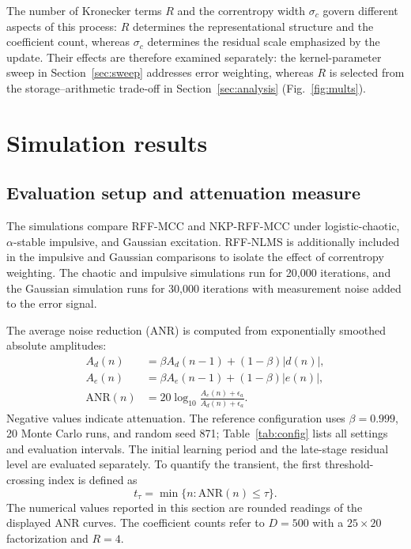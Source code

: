 \documentclass[preprint,12pt]{elsarticle}
\begin{document}
The number of Kronecker terms $R$ and the correntropy width $\sigma_c$ govern different aspects of this process: $R$ determines the representational structure and the coefficient count, whereas $\sigma_c$ determines the residual scale emphasized by the update. Their effects are therefore examined separately: the kernel-parameter sweep in Section~\ref{sec:sweep} addresses error weighting, whereas $R$ is selected from the storage--arithmetic trade-off in Section~\ref{sec:analysis} (Fig.~\ref{fig:mults}).

\section{Simulation results}\label{sec:sim}

\subsection{Evaluation setup and attenuation measure}

The simulations compare RFF-MCC and NKP-RFF-MCC under logistic-chaotic, $\alpha$-stable impulsive, and Gaussian excitation. RFF-NLMS is additionally included in the impulsive and Gaussian comparisons to isolate the effect of correntropy weighting. The chaotic and impulsive simulations run for 20,000 iterations, and the Gaussian simulation runs for 30,000 iterations with measurement noise added to the error signal.

The average noise reduction (ANR) is computed from exponentially smoothed absolute amplitudes:
\begin{equation}
\begin{aligned}
A_d(n) &= \beta A_d(n-1) + (1-\beta)|d(n)|, \\
A_e(n) &= \beta A_e(n-1) + (1-\beta)|e(n)|, \\
\mathrm{ANR}(n) &= 20 \log_{10} \frac{A_e(n) + \epsilon_a}{A_d(n) + \epsilon_a}.
\end{aligned}
\end{equation}
Negative values indicate attenuation. The reference configuration uses $\beta = 0.999$, 20 Monte Carlo runs, and random seed 871; Table~\ref{tab:config} lists all settings and evaluation intervals. The initial learning period and the late-stage residual level are evaluated separately. To quantify the transient, the first threshold-crossing index is defined as
\begin{equation}\label{eq:cross}
t_\tau = \min\{ n : \mathrm{ANR}(n) \leq \tau \}.
\end{equation}
The numerical values reported in this section are rounded readings of the displayed ANR curves. The coefficient counts refer to $D = 500$ with a $25 \times 20$ factorization and $R = 4$.
\end{document}
